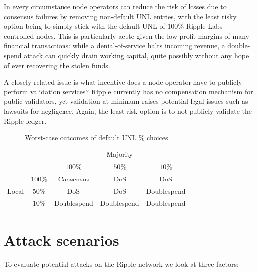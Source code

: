 \documentclass{article}
\begin{document}
In every circumstance node operators can reduce the risk of losses due to
consensus failures by removing non-default UNL entries, with the least risky
option being to simply stick with the default UNL of $100\%$ Ripple Labs
controlled nodes. This is particularly acute given the low profit margins of
many financial transactions: while a denial-of-service halts incoming revenue,
a double-spend attack can quickly drain working capital, quite possibly without
any hope of ever recovering the stolen funds.

A closely related issue is what incentive does a node operator have to publicly
perform validation services? Ripple currently has no compensation mechanism for
public validators, yet validation at minimum raises potential legal issues such
as lawsuits for negligence. Again, the least-risk option is to not publicly
validate the Ripple ledger.

\begin{table}
    \centering

    \begin{tabular}{cc|c|c|c}
        \multicolumn{2}{c}{} & \multicolumn{3}{c}{Majority} \\
        \multicolumn{2}{c}{} & $100\%$ & $50\%$ & $10\%$ \\ \cline{3-5}
        \multirow{3}{*}{Local} & $100\%$ & Consensus & DoS & DoS \\ \cline{2-5}
        ~ & $50\%$ & DoS & DoS & Doublespend \\ \cline{2-5}
        ~ & $10\%$ & Doublespend & Doublespend & Doublespend \\
    \end{tabular}

    \caption{Worst-case outcomes of default UNL \% choices}
    \label{tbl:unl-outcomes}
\end{table}


\section{Attack scenarios}

To evaluate potential attacks on the Ripple network we look at three factors:
\end{document}
